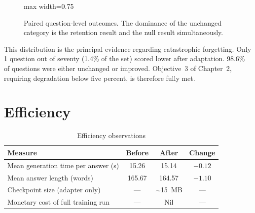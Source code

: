 \documentclass[12pt,a4paper]{report}
\begin{document}
\begin{figure}[htbp]
\centering
\begin{adjustbox}{max width=0.75\textwidth}
\end{adjustbox}
\caption{Paired question-level outcomes. The dominance of the unchanged category
is the retention result and the null result simultaneously.}
\end{figure}

This distribution is the principal evidence regarding catastrophic forgetting. Only 1 question out of seventy (1.4\% of the set) scored lower after adaptation. 98.6\% of questions were either unchanged or improved. Objective~3 of Chapter~2, requiring degradation below five percent, is therefore fully met.

\section{Efficiency}

\begin{table}[htbp]
\centering
\caption{Efficiency observations}
\begin{tabular}{>{\raggedright\arraybackslash}p{5cm} c c c}
\toprule
\textbf{Measure} & \textbf{Before} & \textbf{After} & \textbf{Change} \\
\midrule
Mean generation time per answer (s) & 15.26 & 15.14 & $-0.12$ \\
Mean answer length (words) & 165.67 & 164.57 & $-1.10$ \\
Checkpoint size (adapter only) & --- & $\sim$15~MB & --- \\
Monetary cost of full training run & --- & Nil & --- \\
\bottomrule
\end{tabular}
\end{table}
\end{document}
